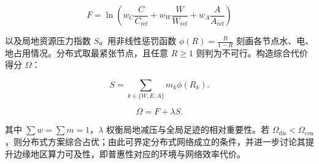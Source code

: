\[
F=\ln (w_C\frac{C}{C_{\mathrm{ref}}}+w_W\frac{W}{W_{\mathrm{ref}}}+w_A\frac{A}{A_{\mathrm{ref}}})
\]

以及局地资源压力指数 $S$。用非线性惩罚函数 $\phi(R)=\frac{R}{1-R}$ 刻画各节点水、电、地占用情况。分布式取最紧张节点，且任意 $R\geq1$ 则判为不可行。构造综合代价得分 $\Omega$：

\[
S=\sum_{k\in\{W,E,A\}}m_k\phi(R_k).
\]

\[
\Omega=F+\lambda S.
\]

其中 $\sum w=\sum m=1$，$\lambda$ 权衡局地减压与全局足迹的相对重要性。若 $\Omega_{\mathrm{dis}}<\Omega_{\mathrm{cen}}$，则分布式方案综合占优；由此可界定分布式网络成立的条件，并进一步讨论其提升边缘地区算力可及性，即普惠性对应的环境与网络效率代价。
